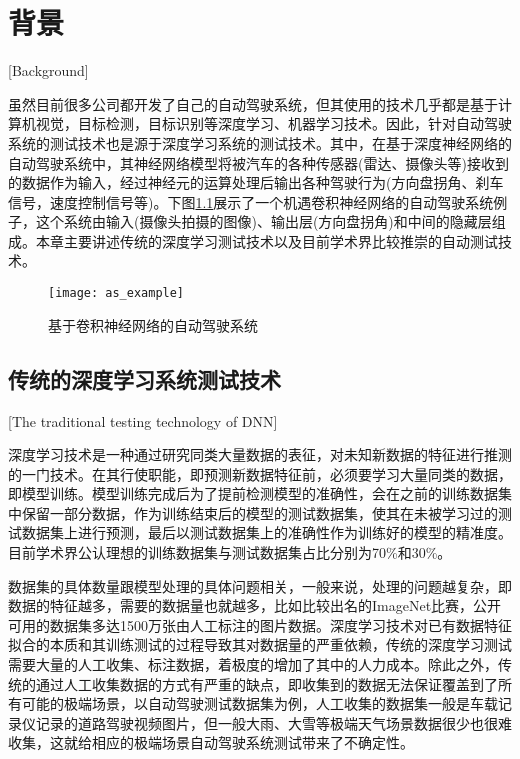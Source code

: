 
\chapter{背景}[Background]

虽然目前很多公司都开发了自己的自动驾驶系统，但其使用的技术几乎都是基于计算机视觉，目标检测，目标识别等深度学习、机器学习技术。因此，针对自动驾驶系统的测试技术也是源于深度学习系统的测试技术。其中，在基于深度神经网络的自动驾驶系统中，其神经网络模型将被汽车的各种传感器(雷达、摄像头等)接收到的数据作为输入，经过神经元的运算处理后输出各种驾驶行为(方向盘拐角、刹车信号，速度控制信号等)。下图\ref{as_example}展示了一个机遇卷积神经网络的自动驾驶系统例子，这个系统由输入(摄像头拍摄的图像)、输出层(方向盘拐角)和中间的隐藏层组成。本章主要讲述传统的深度学习测试技术以及目前学术界比较推崇的自动测试技术。

\begin{figure}[h]
    \centering
    \texttt{[image: as\_example]}
    \caption{基于卷积神经网络的自动驾驶系统\cite{DeepRoad}}
    \label{as_example}
\end{figure}

\section{传统的深度学习系统测试技术}[The traditional testing technology of DNN]

深度学习技术是一种通过研究同类大量数据的表征，对未知新数据的特征进行推测的一门技术。在其行使职能，即预测新数据特征前，必须要学习大量同类的数据，即模型训练。模型训练完成后为了提前检测模型的准确性，会在之前的训练数据集中保留一部分数据，作为训练结束后的模型的测试数据集，使其在未被学习过的测试数据集上进行预测，最后以测试数据集上的准确性作为训练好的模型的精准度。目前学术界公认理想的训练数据集与测试数据集占比分别为70\%和30\%。


数据集的具体数量跟模型处理的具体问题相关，一般来说，处理的问题越复杂，即数据的特征越多，需要的数据量也就越多，比如比较出名的ImageNet\cite{ImageNet}比赛，公开可用的数据集多达1500万张由人工标注的图片数据。深度学习技术对已有数据特征拟合的本质和其训练测试的过程导致其对数据量的严重依赖，传统的深度学习测试需要大量的人工收集、标注数据，着极度的增加了其中的人力成本。除此之外，传统的通过人工收集数据的方式有严重的缺点，即收集到的数据无法保证覆盖到了所有可能的极端场景，以自动驾驶测试数据集为例，人工收集的数据集一般是车载记录仪记录的道路驾驶视频图片，但一般大雨、大雪等极端天气场景数据很少也很难收集，这就给相应的极端场景自动驾驶系统测试带来了不确定性。


